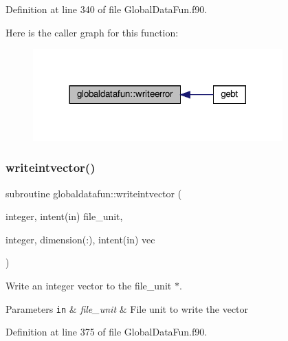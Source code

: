 Definition at line 340 of file Global\+Data\+Fun.\+f90.

Here is the caller graph for this function\+:\nopagebreak
\begin{figure}[H]
\begin{center}
\leavevmode
\includegraphics[width=272pt]{namespaceglobaldatafun_ab8bdea863cb470f4098dbfd74bd27faa_icgraph}
\end{center}
\end{figure}
\mbox{\label{namespaceglobaldatafun_a08c5dd4cdc68f1694d0d44f76c4df0d5}} 
\subsubsection{\texorpdfstring{writeintvector()}{writeintvector()}}
{\footnotesize\ttfamily subroutine globaldatafun\+::writeintvector (\begin{DoxyParamCaption}\item[{integer, intent(in)}]{file\+\_\+unit,  }\item[{integer, dimension(\+:), intent(in)}]{vec }\end{DoxyParamCaption})\hspace{0.3cm}{\ttfamily [private]}}



Write an integer vector to the file\+\_\+unit $\ast$. 


\begin{DoxyParams}[1]{Parameters}
\mbox{\tt in}  & {\em file\+\_\+unit} & File unit to write the vector \\
\hline
\end{DoxyParams}


Definition at line 375 of file Global\+Data\+Fun.\+f90.

\mbox{\label{namespaceglobaldatafun_a6a36231350f9af76a3a20cd590f6e40a}} 

